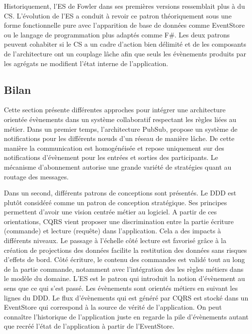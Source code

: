 Historiquement, l'\gls{ES} de Fowler dans ses premières versions ressemblait plus 
à du \gls{CS}. L'évolution de l'\gls{ES} a conduit à revoir ce patron théoriquement 
sous une forme fonctionnelle pure avec l'apparition de base de données comme 
EventStore ou le langage de programmation plus adaptés comme F\#. Les deux 
patrons peuvent cohabiter si le \gls{CS} a un cadre d'action bien délimité 
et de les composants de l'architecture ont un couplage lâche afin que seuls les 
évènements produits par les agrégats ne modifient l'état interne de l'application. 


\subsection{Bilan}
Cette section présente différentes approches pour intégrer une architecture 
orientée évènements dans un système collaboratif
respectant les règles liées au métier. Dans un premier temps, 
l'architecture \gls{PubSub}, propose un système de notifications pour les différents 
n\oe uds d'un réseau de manière lâche. De cette manière la communication est 
homogénéisée et repose uniquement sur des notifications d'évènement pour les 
entrées et sorties des participants. Le mécanisme d'abonnement autorise une 
grande variété de stratégies quant au routage des messages.

Dans un second, différents patrons de conceptions sont présentés. Le \gls{DDD} 
est plutôt considéré comme un patron de conception stratégique. Ses principes 
permettent d'avoir une vision centrée métier au logiciel. A partir de ces 
orientations, \gls{CQRS} vient proposer une discrimination entre la partie écriture 
(commande) et lecture (requête) dans l'application. Cela a des impacts à différents 
niveaux. Le passage à l'échelle côté lecture est favorisé grâce à la création de 
projections des données facilite la restitution des données sans risques d'effets de 
bord. Côté écriture, le contenu des commandes est validé tout au long de la partie 
commande, notamment avec l'intégration des les règles métiers dans le modèle 
du domaine. L'\gls{ES} est le patron qui introduit la notion d'évènement au sens 
que \og ce qui s'est passé\fg{}. Les évènements sont orientés métiers en suivant 
les lignes du \gls{DDD}. Le flux d'évènements qui est généré par 
\gls{CQRS} est stocké dans un \gls{EventStore} qui correspond à la source de 
vérité de l'application. On peut connaître l'historique de l'application 
juste en regarde la pile d'évènements autant que recréé l'état de l'application à 
partir de l'\gls{EventStore}.  

